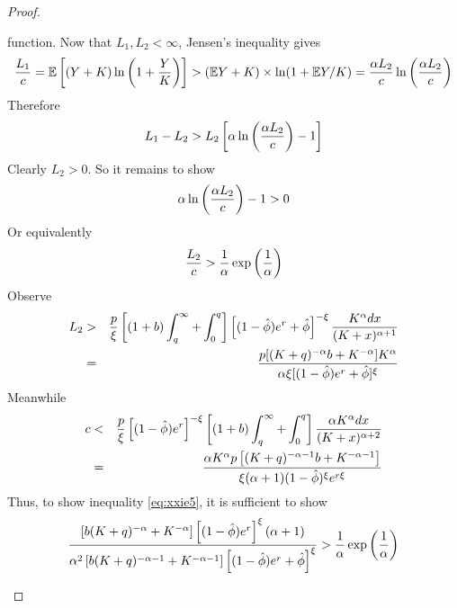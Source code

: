 \documentclass{article}
\newcommand{\E}{
  \mathbb{E}
}
\newcommand{\1}[1]{
  \mathbf{1}_{\{#1\}}
}
\begin{document}
\begin{proof}
\begin{enumerate}[i.]
    function. Now that $L_1, L_2 < \infty$, Jensen's inequality gives
    \[
    {L_1 \over c} = \E \left[
      (Y + K) \ln \left(1 + {Y \over K} \right)
    \right]
    >
    (\E Y + K) \times \ln(1 + \E Y/K)
    =
    {\alpha L_2  \over c}
    \ln\left(
      {\alpha L_2  \over c}
    \right)
    \]
    Therefore
    \[
    L_1 - L_2 > L_2 \left[
      \alpha \ln \left(
        {\alpha L_2 \over c}
      \right) - 1
    \right]
    \]
    Clearly $L_2 > 0$. So it remains to show
    \[
    \alpha \ln \left(
      {\alpha L_2 \over c}
    \right) - 1 > 0
    \]
    Or equivalently
    \begin{equation}
      \label{eq:xxie5}
      {L_2 \over c} > {1 \over \alpha} \exp\left( {1 \over \alpha} \right)
    \end{equation}
    Observe
    \begin{eqnarray*}
      L_2 &>&
      {p \over \xi}
      \left[
        (1 + b)\int_{q}^{\infty} +
        \int_{0}^q
      \right]
      \left[
        (1 - \hat\phi) e^r + \hat\phi
      \right]^{-\xi}
      {K^{\alpha} dx
        \over
        (K + x)^{\alpha + 1}
      } \\
      &=& {
        p [(K + q)^{-\alpha} b + K^{-\alpha}] K^\alpha
        \over
        \alpha \xi [(1 - \hat\phi) e^r + \hat\phi]^\xi
      } 
    \end{eqnarray*}
    Meanwhile
    \begin{eqnarray*}
      c &<& {p \over \xi}
      \left[
        (1 - \hat\phi) e^r
      \right]^{-\xi}
      \left[
        (1 + b)\int_{q}^{\infty} +
        \int_{0}^q
      \right]
      {
        \alpha K^{\alpha} dx \over (K + x)^{\alpha + 2}
      } \\
      &=&
      {
        \alpha K^\alpha p \left[
          (K + q)^{-\alpha - 1} b + K^{-\alpha - 1}
        \right]
        \over
        \xi (\alpha + 1) (1 - \hat\phi)^\xi e^{r \xi}
      }
    \end{eqnarray*}
    Thus, to show inequality \eqref{eq:xxie5}, it is sufficient to show
    \begin{equation}
      \label{eq:xxie6}
      {
        \left[
          b (K + q)^{-\alpha} + K^{-\alpha}
        \right]
        \left[
          (1 - \hat\phi) e^r
        \right]^{\xi}
        (\alpha + 1)
        \over
        \alpha^2
        \left[
          b (K + q)^{-\alpha - 1} + K^{-\alpha - 1}
        \right]
        \left[
          (1 - \hat\phi) e^r + \hat\phi
        \right]^{\xi}
      } > {1 \over \alpha} \exp\left( {1 \over \alpha} \right)
    \end{equation}

\end{enumerate}
\end{proof}
\end{document}
